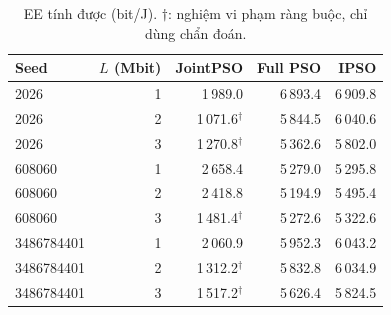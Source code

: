 \begin{table}
\centering
\renewcommand{\arraystretch}{1.16}
\setlength{\tabcolsep}{5pt}
\begin{tabular}{lrrrr}
\toprule
Seed & $L$ (Mbit) & JointPSO & Full PSO & IPSO \\
\midrule
2026 & 1 & 1\,989.0 & 6\,893.4 & 6\,909.8 \\
2026 & 2 & 1\,071.6$^{\dagger}$ & 5\,844.5 & 6\,040.6 \\
2026 & 3 & 1\,270.8$^{\dagger}$ & 5\,362.6 & 5\,802.0 \\
608060 & 1 & 2\,658.4 & 5\,279.0 & 5\,295.8 \\
608060 & 2 & 2\,418.8 & 5\,194.9 & 5\,495.4 \\
608060 & 3 & 1\,481.4$^{\dagger}$ & 5\,272.6 & 5\,322.6 \\
3486784401 & 1 & 2\,060.9 & 5\,952.3 & 6\,043.2 \\
3486784401 & 2 & 1\,312.2$^{\dagger}$ & 5\,832.8 & 6\,034.9 \\
3486784401 & 3 & 1\,517.2$^{\dagger}$ & 5\,626.4 & 5\,824.5 \\
\bottomrule
\end{tabular}
\caption{EE tính được (bit/J). $\dagger$: nghiệm vi phạm ràng buộc, chỉ dùng chẩn đoán.}
\end{table}
